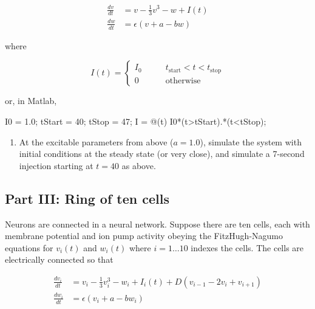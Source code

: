 \documentclass[
  letterpaper,
  DIV=11,
  numbers=noendperiod]{scrartcl}
\newenvironment{Shaded}{\begin{snugshade}}{\end{snugshade}}
\newcommand{\FloatTok}[1]{\textcolor[rgb]{0.68,0.00,0.00}{#1}}
\newcommand{\NormalTok}[1]{\textcolor[rgb]{0.00,0.23,0.31}{#1}}
\newcommand{\OperatorTok}[1]{\textcolor[rgb]{0.37,0.37,0.37}{#1}}
\newcommand{\VariableTok}[1]{\textcolor[rgb]{0.07,0.07,0.07}{#1}}
\providecommand{\tightlist}{%
  \setlength{\itemsep}{0pt}\setlength{\parskip}{0pt}}
\begin{document}
\[
\begin{aligned}
\frac{dv}{dt} &= v - \frac{1}{3} v^3 - w + I(t)\\
\frac{dw}{dt} &= \epsilon \left( v + a - bw\right)
\end{aligned}
\]

where

\[
I(t) = \begin{cases}
I_0 & \qquad t_\mathrm{start} < t < t_\mathrm{stop}\\
0 & \qquad \text{otherwise}
\end{cases}
\]

or, in Matlab,

\begin{Shaded}
\begin{Highlighting}[]
\VariableTok{I0} \OperatorTok{=} \FloatTok{1.0}\OperatorTok{;}
\VariableTok{tStart} \OperatorTok{=} \FloatTok{40}\OperatorTok{;}
\VariableTok{tStop} \OperatorTok{=} \FloatTok{47}\OperatorTok{;}
\VariableTok{I} \OperatorTok{=} \OperatorTok{@}\NormalTok{(}\VariableTok{t}\NormalTok{) }\VariableTok{I0}\OperatorTok{*}\NormalTok{(}\VariableTok{t}\OperatorTok{\textgreater{}}\VariableTok{tStart}\NormalTok{)}\OperatorTok{.*}\NormalTok{(}\VariableTok{t}\OperatorTok{\textless{}}\VariableTok{tStop}\NormalTok{)}\OperatorTok{;}
\end{Highlighting}
\end{Shaded}

\begin{enumerate}
\def\labelenumi{\alph{enumi}.}
\setcounter{enumi}{2}
\tightlist
\item
  At the excitable parameters from above (\(a=1.0\)), simulate the
  system with initial conditions at the steady state (or very close),
  and simulate a 7-second injection starting at \(t=40\) as above.
\end{enumerate}

\subsection{Part III: Ring of ten
cells}\label{part-iii-ring-of-ten-cells}

Neurons are connected in a neural network. Suppose there are ten cells,
each with membrane potential and ion pump activity obeying the
FitzHugh-Nagumo equations for \(v_i(t)\) and \(w_i(t)\) where
\(i=1 \ldots 10\) indexes the cells. The cells are electrically
connected so that

\[
\begin{aligned}
\frac{dv_i}{dt} &= v_i - \frac{1}{3} v_i^3 - w_i + I_i(t) + D\left( v_{i-1} - 2 v_i + v_{i+1}\right)\\
\frac{dw_i}{dt} &= \epsilon \left( v_i + a - bw_i\right)
\end{aligned}
\]
\end{document}

